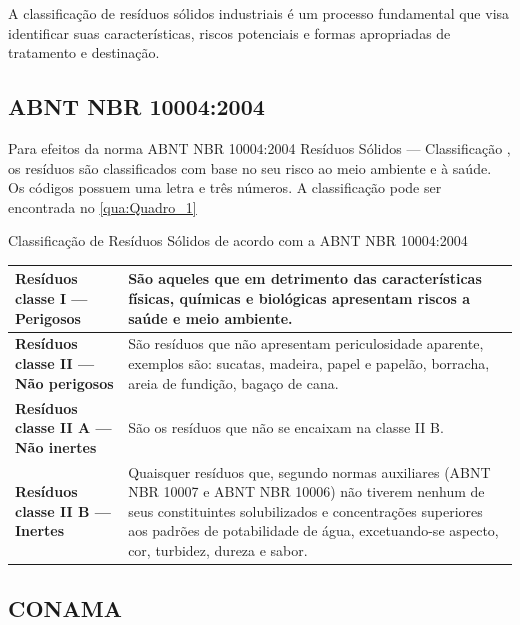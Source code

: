 A classificação de resíduos sólidos industriais é um processo fundamental que visa identificar suas características, riscos potenciais e formas apropriadas de tratamento e destinação. 

\subsection{ABNT NBR 10004:2004}

Para efeitos da norma ABNT NBR 10004:2004 Resíduos Sólidos — Classificação \cite{abnt_abnt_2004}, os resíduos são classificados com base no seu risco ao meio ambiente e à saúde. Os códigos possuem uma letra e três números. A classificação pode ser encontrada no \autoref{qua:Quadro_1}

\begin{quadro}[htb]
	\centering
	\caption{\label{qua:Quadro_1} Classificação de Resíduos Sólidos de acordo com a ABNT NBR 10004:2004}	
	\resizebox{\textwidth}{!}
	{\begin{tabular}{|l|p{11cm}|}
		\hline
		\textbf{Resíduos classe I — Perigosos} & São aqueles que em detrimento das características físicas, químicas e biológicas apresentam riscos a saúde e meio ambiente.  \\ \hline
		\textbf{Resíduos classe II — Não perigosos}        & São resíduos que não apresentam periculosidade aparente, exemplos são: sucatas, madeira, papel e papelão, borracha, areia de fundição, bagaço de cana.\\ \hline
		\textbf{Resíduos classe II A — Não inertes}          & São os resíduos que não se encaixam na classe II B. \\ \hline
		\textbf{Resíduos classe II B — Inertes}        & Quaisquer resíduos que, segundo normas auxiliares (ABNT NBR 10007 e ABNT NBR 10006) não tiverem nenhum de seus constituintes solubilizados e concentrações superiores aos padrões de potabilidade de água, excetuando-se aspecto, cor, turbidez, dureza e sabor. \\ \hline
	\end{tabular}}
\end{quadro}


\subsection{CONAMA}

